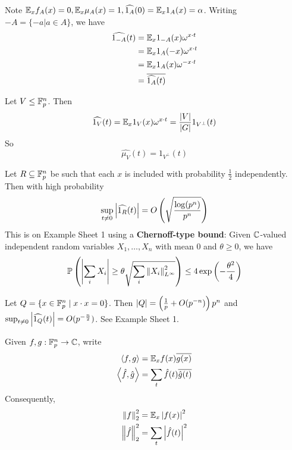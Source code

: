\documentclass{article}
\begin{document}
Note $\mathbb E_x f_A(x) = 0, \mathbb E_x \mu_A(x) = 1, \widehat{1_A}(0) = \mathbb E_x 1_A(x) = \alpha$. Writing $-A = \{-a | a \in A\}$, we have
\begin{align*}
  \widehat{1_{-A}}(t)
  & = \mathbb E_x 1_{-A}(x) \omega^{x \cdot t} \\
  & = \mathbb E_x 1_A(-x) \omega^{x \cdot t} \\
  & = \mathbb E_x 1_A(x) \omega^{-x \cdot t} \\
  & = \overline{\widehat{1_A}(t)}
\end{align*}

\begin{nex}\label{ex:dft-subspace}
  Let $V \le \mathbb F_p^n$. Then
  $$\widehat{1_V}(t) = \mathbb E_x 1_V(x) \omega^{x \cdot t} = \frac{\left\lvert V\right\rvert}{\left\lvert G\right\rvert} 1_{V^\perp}(t)$$
  So
  $$\widehat{\mu_V}(t) = 1_{V^\perp}(t)$$
\end{nex}

\begin{nex}\label{ex:dft-random-set}
  Let $R \subseteq \mathbb F_p^n$ be such that each $x$ is included with probability $\frac 12$ independently. Then with high probability
  $$\sup_{t \ne 0} \left\lvert \widehat{1_R}(t)\right\rvert = O\left(\sqrt{\frac{\log(p^n)}{p^n}}\right)$$
  This is on Example Sheet 1 using a {\bf Chernoff-type bound}: Given $\mathbb C$-valued independent random variables $X_1, \dots, X_n$ with mean $0$ and $\theta \ge 0$, we have
  $$\mathbb P\left(\left\lvert \sum_i X_i\right\rvert \ge \theta\sqrt{\sum_i \left\lVert X_i\right\rVert^2_{L^\infty}}\right) \le 4\exp\left(-\frac{\theta^2}4\right)$$
\end{nex}

\begin{nex}
  Let $Q = \{x \in \mathbb F_p^n \mid x \cdot x = 0\}$. Then $\left\lvert Q\right\rvert = \left(\frac 1p + O(p^{-n})\right)p^n$ and $\sup_{t \ne 0} \left\lvert \widehat{1_Q}(t)\right\rvert = O(p^{-\frac n2})$. See Example Sheet 1.
\end{nex}

\begin{notation}
  Given $f, g : \mathbb F_p^n \to \mathbb C$, write
  \begin{align*}
    \left\langle f, g\right\rangle & = \mathbb E_x f(x) \overline{g(x)} \\
    \left\langle \hat f, \hat g\right\rangle & = \sum_t \hat f(t) \overline{\hat g(t)}
  \end{align*}
  Consequently,
  \begin{align*}
    \left\lVert f\right\rVert_2^2 & = \mathbb E_x \left\lvert f(x)\right\rvert^2 \\
    \left\lVert \hat f\right\rVert_2^2 & = \sum_t \left\lvert \hat f(t)\right\rvert^2
  \end{align*}
\end{notation}
\end{document}
